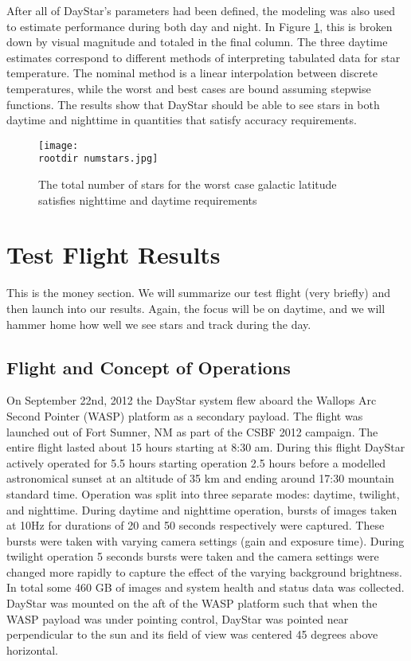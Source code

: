 \documentclass[twocolumn,letterpaper]{IEEEAerospace2012}
\newcommand{\rootdir}{./Figures/}
\begin{document}
After all of DayStar's parameters had been defined, the modeling was also used to estimate performance during both day and night. In Figure \ref{fig:numstars}, this is broken down by visual magnitude and totaled in the final column. The three daytime estimates correspond to different methods of interpreting tabulated data for star temperature. The nominal method is a linear interpolation between discrete temperatures, while the worst and best cases are bound assuming stepwise functions. The results show that DayStar should be able to see stars in both daytime and nighttime in quantities that satisfy accuracy requirements.
\begin{figure}[H]
    \label{fig:numstars}
    \texttt{[image: \\rootdir numstars.jpg]}
    \caption{The total number of stars for the worst case galactic latitude satisfies nighttime and daytime requirements}
\end{figure}

\section{Test Flight Results}
This is the money section. We will summarize our test flight (very briefly) and then launch into our results. Again, the focus will be on daytime, and we will hammer home how well we see stars and track during the day.

\subsection{Flight and Concept of Operations}
On September 22nd, 2012 the DayStar system flew aboard the Wallops Arc Second Pointer (WASP) platform as a secondary payload. The flight was launched out of Fort Sumner, NM as part of the CSBF 2012 campaign. The entire flight lasted about 15 hours starting at 8:30 am. During this flight DayStar actively operated for 5.5 hours starting operation 2.5 hours before a modelled astronomical sunset at an altitude of 35 km and ending around 17:30 mountain standard time. Operation was split into three separate modes: daytime, twilight, and nighttime. During daytime and nighttime operation, bursts of images taken at 10Hz for durations of 20 and 50 seconds respectively were captured. These bursts were taken with varying camera settings (gain and exposure time). During twilight operation 5 seconds bursts were taken and the camera settings were changed more rapidly to capture the effect of the varying background brightness. In total some 460 GB of images and system health and status data was collected. DayStar was
mounted on the aft of the WASP platform such that when the WASP payload was under pointing control, DayStar was pointed near perpendicular to the sun and its field of view was centered 45 degrees above horizontal.
\end{document}
